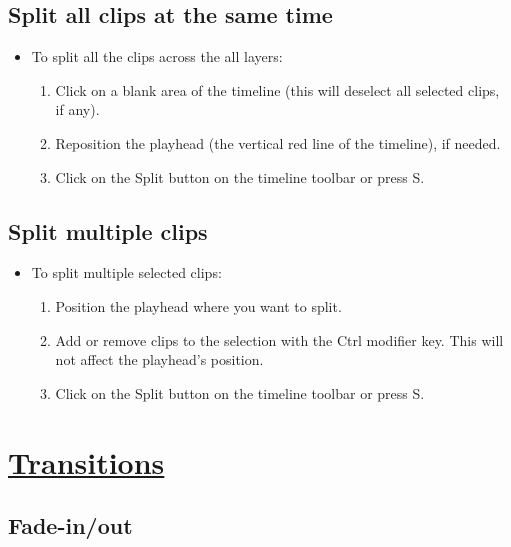 
\section{Split all clips at the same time}

\begin{itemize}
\item To split all the clips across the all layers:
  \begin{enumerate}
  \item Click on a blank area of the timeline (this will deselect all
    selected clips, if any).
  \item Reposition the playhead (the vertical red line of the timeline), if needed.
  \item Click on the Split button on the timeline toolbar or press S.
  \end{enumerate}
\end{itemize}


\section{Split multiple clips}

\begin{itemize}
\item To split multiple selected clips:
  \begin{enumerate}
  \item Position the playhead where you want to split.
  \item Add or remove clips to the selection with the Ctrl modifier
    key. This will not affect the playhead's position.
  \item Click on the Split button on the timeline toolbar or press S.
  \end{enumerate}
\end{itemize}



\chapter{\href{http://www.pitivi.org/manual/transitions.html}{Transitions}}

\section{Fade-in/out}

